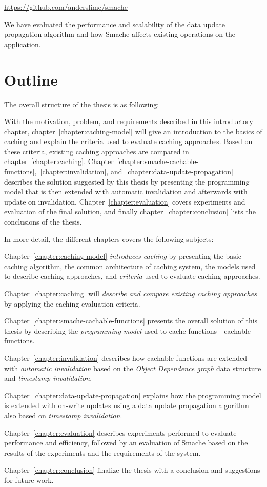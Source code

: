 \url{https://github.com/anderslime/smache}

We have evaluated the performance and scalability of the data update propagation algorithm and how Smache affects existing operations on the application.

\section{Outline}
\label{sec:outline}

The overall structure of the thesis is as following:

With the motivation, problem, and requirements described in this introductory chapter, chapter~\ref{chapter:caching-model} will give an introduction to the basics of caching and explain the criteria used to evaluate caching approaches. Based on these criteria, existing caching approaches are compared in chapter~\ref{chapter:caching}. Chapter~\ref{chapter:smache-cachable-functions},~\ref{chapter:invalidation}, and~\ref{chapter:data-update-propagation} describes the solution suggested by this thesis by presenting the programming model that is then extended with automatic invalidation and afterwards with update on invalidation. Chapter~\ref{chapter:evaluation} covers experiments and evaluation of the final solution, and finally chapter~\ref{chapter:conclusion} lists the conclusions of the thesis.

In more detail, the different chapters covers the following subjects:

Chapter~\ref{chapter:caching-model} \emph{introduces caching} by presenting the basic caching algorithm, the common architecture of caching system, the models used to describe caching approaches, and \emph{criteria} used to evaluate caching approaches.

Chapter~\ref{chapter:caching} will \emph{describe and compare existing caching approaches} by applying the caching evaluation criteria.

Chapter~\ref{chapter:smache-cachable-functions} presents the overall solution of this thesis by describing the \emph{programming model} used to cache functions - cachable functions.

Chapter~\ref{chapter:invalidation} describes how cachable functions are extended with \emph{automatic invalidation} based on the \emph{Object Dependence graph} data structure and \emph{timestamp invalidation}.

Chapter~\ref{chapter:data-update-propagation} explains how the programming model is extended with on-write updates using a data update propagation algorithm also based on \emph{timestamp invalidation}.

Chapter~\ref{chapter:evaluation} describes experiments performed to evaluate performance and efficiency, followed by an evaluation of Smache based on the results of the experiments and the requirements of the system.

Chapter~\ref{chapter:conclusion} finalize the thesis with a conclusion and suggestions for future work.




